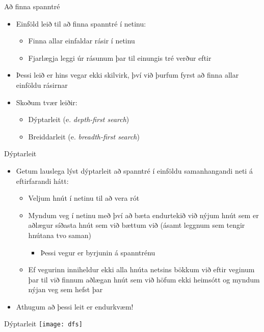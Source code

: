 \documentclass[handout]{beamer}
\begin{document}
\begin{frame}{Að finna spanntré}
\begin{itemize}
 \item Einföld leið til að finna spanntré í netinu: 
 \begin{itemize}
  \item Finna allar einfaldar rásir í netinu
  \item Fjarlægja leggi úr rásunum þar til einungis tré verður eftir
 \end{itemize}
 \item Þessi leið er hins vegar ekki skilvirk, því við þurfum fyrst að finna allar einföldu rásirnar
 \item Skoðum tvær leiðir:
 \begin{itemize}
  \item Dýptarleit (e. \emph{depth-first search})
  \item Breiddarleit (e. \emph{breadth-first search})
 \end{itemize}
\end{itemize}
\end{frame}

\begin{frame}{Dýptarleit}
\begin{itemize}
 \item Getum lauslega lýst dýptarleit að spanntré í einföldu samanhangandi neti á eftirfarandi hátt:
 \begin{itemize}
  \item Veljum hnút í netinu til að vera rót
  \item Myndum veg í netinu með því að bæta endurtekið við nýjum hnút sem er aðlægur síðasta hnút sem við bættum við (ásamt leggnum sem tengir hnútana tvo saman)
  \begin{itemize}
   \item Þessi vegur er byrjunin á spanntrénu
  \end{itemize}
  \item Ef vegurinn inniheldur ekki alla hnúta netsins bökkum við eftir veginum þar til við finnum aðlægan hnút sem við höfum ekki heimsótt og myndum nýjan veg sem hefst þar
 \end{itemize}
 \item Athugum að þessi leit er endurkvæm!
\end{itemize}
\end{frame}

\begin{frame}{Dýptarleit}
    \texttt{[image: dfs]}
\end{frame}
\end{document}

